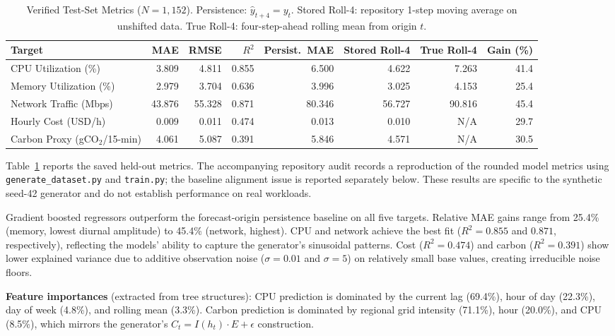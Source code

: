 \documentclass[conference]{IEEEtran}
\begin{document}
\begin{table}[t]
  \caption{Verified Test-Set Metrics ($N=1{,}152$). Persistence: $\hat{y}_{t+4}=y_t$.
  Stored Roll-4: repository 1-step moving average on unshifted data.
  True Roll-4: four-step-ahead rolling mean from origin $t$.}
  \label{tab:results}
  \centering
  \footnotesize
  \setlength{\tabcolsep}{5pt}
  \begin{tabular}{lrrrrrrr}
    \toprule
    \textbf{Target} & \textbf{MAE} & \textbf{RMSE} & \textbf{$R^2$}
      & \textbf{Persist.\ MAE} & \textbf{Stored Roll-4} & \textbf{True Roll-4}
      & \textbf{Gain (\%)} \\
    \midrule
    CPU Utilization (\%)          & 3.809 & 4.811 & 0.855 & 6.500 & 4.622 & 7.263 & 41.4 \\
    Memory Utilization (\%)       & 2.979 & 3.704 & 0.636 & 3.996 & 3.025 & 4.153 & 25.4 \\
    Network Traffic (Mbps)        & 43.876 & 55.328 & 0.871 & 80.346 & 56.727 & 90.816 & 45.4 \\
    Hourly Cost (USD/h)           & 0.009 & 0.011 & 0.474 & 0.013 & 0.010 & N/A & 29.7 \\
    Carbon Proxy (gCO$_2$/15-min) & 4.061 & 5.087 & 0.391 & 5.846 & 4.571 & N/A & 30.5 \\
    \bottomrule
  \end{tabular}
\end{table}

Table~\ref{tab:results} reports the saved held-out metrics. The accompanying
repository audit records a reproduction of the rounded model metrics using
\texttt{generate\_dataset.py} and \texttt{train.py}; the baseline alignment issue
is reported separately below. These results are specific to the synthetic
seed-42 generator and do not establish performance on real workloads.

Gradient boosted regressors outperform the forecast-origin persistence
baseline on all five targets. Relative MAE gains range from 25.4\%
(memory, lowest diurnal amplitude) to 45.4\% (network, highest).
CPU and network achieve the best fit ($R^2=0.855$ and $0.871$,
respectively), reflecting the models' ability to capture the generator's
sinusoidal patterns. Cost ($R^2=0.474$) and carbon ($R^2=0.391$) show
lower explained variance due to additive observation noise ($\sigma=0.01$
and $\sigma=5$) on relatively small base values, creating irreducible
noise floors.

\textbf{Feature importances} (extracted from tree structures):
CPU prediction is dominated by the current lag (69.4\%), hour of day (22.3\%),
day of week (4.8\%), and rolling mean (3.3\%). Carbon prediction is dominated
by regional grid intensity (71.1\%), hour (20.0\%), and CPU (8.5\%), which
mirrors the generator's $C_t = I(h_t)\cdot E + \epsilon$ construction.
\end{document}
